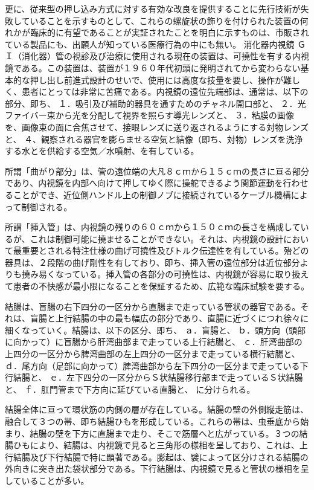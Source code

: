 更に、従来型の押し込み方式に対する有効な改良を提供することに先行技術が失敗していることを示すものとして、これらの螺旋状の飾りを付けられた装置の何れかが臨床的に有望であることが実証されたことを明白に示すものは、市販されている製品にも、出願人が知っている医療行為の中にも無い。 消化器内視鏡 ＧＩ（消化器）管の視診及び治療に使用される現在の装置は、可撓性を有する内視鏡である。この装置は、装置が１９６０年代初頭に発明されてから変わらない基本的な押し出し前進式設計のせいで、使用には高度な技量を要し、操作が難しく、患者にとっては非常に苦痛である。内視鏡の遠位先端部は、通常は、以下の部分、即ち、 １．吸引及び補助的器具を通すためのチャネル開口部と、 ２．光ファイバー束から光を分配して視界を照らす導光レンズと、 ３．粘膜の画像を、画像束の面に合焦させて、接眼レンズに送り返されるようにする対物レンズと、 ４、観察される器官を膨らませる空気と結像（即ち、対物）レンズを洗浄する水とを供給する空気／水噴射、を有している。

所謂「曲がり部分」は、管の遠位端の大凡８ｃｍから１５ｃｍの長さに亘る部分であり、内視鏡を内部へ向けて押してゆく際に操舵できるよう関節運動を行わせることができ、近位側ハンドル上の制御ノブに接続されているケーブル機構によって制御される。

所謂「挿入管」は、内視鏡の残りの６０ｃｍから１５０ｃｍの長さを構成しているが、これは制御可能に撓ませることができない。それは、内視鏡の設計において最重要とされる特注仕様の曲げ可撓性及びトルク伝達性を有している。殆どの器具は、２段階の曲げ剛性を有しており、即ち、挿入管の遠位部分は近位部分よりも撓み易くなっている。挿入管の各部分の可撓性は、内視鏡が容易に取り扱えて患者の不快感が最小限になることを保証するため、広範な臨床試験を要する。

結腸は、盲腸の右下四分の一区分から直腸まで走っている管状の器官である。それは、盲腸と上行結腸の中の最も幅広の部分であり、直腸に近づくにつれ徐々に細くなっていく。結腸は、以下の区分、即ち、 ａ．盲腸と、 ｂ．頭方向（頭部に向かって）に盲腸から肝湾曲部まで走っている上行結腸と、 ｃ．肝湾曲部の上四分の一区分から脾湾曲部の左上四分の一区分まで走っている横行結腸と、 ｄ．尾方向（足部に向かって）脾湾曲部から左下四分の一区分まで走っている下行結腸と、 ｅ．左下四分の一区分からＳ状結腸移行部まで走っているＳ状結腸と、 ｆ．肛門管まで下方向に延びている直腸と、 に分けられる。

結腸全体に亘って環状筋の内側の層が存在している。結腸の壁の外側縦走筋は、融合して３つの帯、即ち結腸ひもを形成している。これらの帯は、虫垂底から始まり、結腸の壁を下方に直腸まで走り、そこで筋層へと広がっている。３つの結腸ひもにより、結腸は、内視鏡で見ると三角形の様相を呈しており、これは、上行結腸及び下行結腸で特に顕著である。膨起は、襞によって区分けされる結腸の外向きに突き出た袋状部分である。下行結腸は、内視鏡で見ると管状の様相を呈していることが多い。

